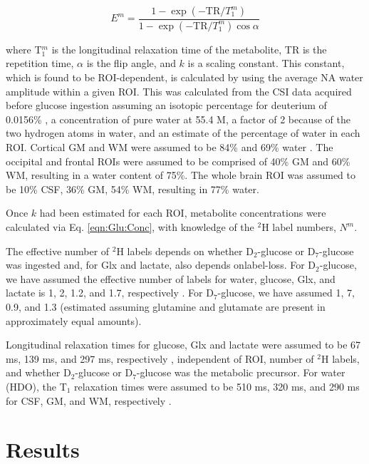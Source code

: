 \begin{equation}
    E^m = \frac{1-\exp(-\text{TR}/T_1^m)}{1-\exp(-\text{TR}/T_1^m)\cos{\alpha}}
    \label{eqn:Glu:Atte}
\end{equation}

where T$_1^m$ is the longitudinal relaxation time of the metabolite, TR is the repetition time, $\alpha$ is the flip angle, and $k$ is a scaling constant. This constant, which is found to be \ac{ROI}-dependent, is calculated by using the average \ac{NA} water amplitude within a given \ac{ROI}. This was calculated from the \ac{CSI} data acquired before glucose ingestion assuming an isotopic percentage for deuterium of 0.0156\% \cite{Hagemann1970AbsoluteSMOW}, a concentration of pure water at 55.4 M, a factor of 2 because of the two hydrogen atoms in water, and an estimate of the percentage of water in each \ac{ROI}. Cortical \ac{GM} and \ac{WM} were assumed to be 84\% and 69\% water \cite{Oros-Peusquens2019AImplications}. The occipital and frontal \ac{ROI}s were assumed to be comprised of 40\% \ac{GM} and 60\% \ac{WM}, resulting in a water content of 75\%. The whole brain \ac{ROI} was assumed to be 10\% \ac{CSF}, 36\% \ac{GM}, 54\% \ac{WM}, resulting in 77\% water.

Once $k$ had been estimated for each \ac{ROI}, metabolite concentrations were calculated via Eq. \ref{eqn:Glu:Conc}, with knowledge of the $^2$H label numbers, $N^m$.

The effective number of $^2$H labels depends on whether D$_2$-glucose or D$_7$-glucose was ingested and, for Glx and lactate, also depends onlabel-loss. For D$_2$-glucose, we have assumed the effective number of labels for water, glucose, Glx, and lactate is 1, 2, 1.2, and 1.7, respectively \cite{DeGraaf2021CharacterizationStudies}. For D$_7$-glucose, we have assumed 1, 7, 0.9, and 1.3 (estimated \cite{Funk2017TheGlucose} assuming glutamine and glutamate are present in approximately equal amounts). 

Longitudinal relaxation times for glucose, Glx and lactate were assumed to be 67 ms, 139 ms, and 297 ms, respectively \cite{DeFeyter2018DeuteriumVivo}, independent of \ac{ROI}, number of $^2$H labels, and whether D$_2$-glucose or D$_7$-glucose was the metabolic precursor. For water (\ac{HDO}), the T$_1$ relaxation times were assumed to be 510 ms, 320 ms, and 290 ms for \ac{CSF}, \ac{GM}, and \ac{WM}, respectively \cite{Cocking2023DeuteriumDosing}.

\section{Results}

